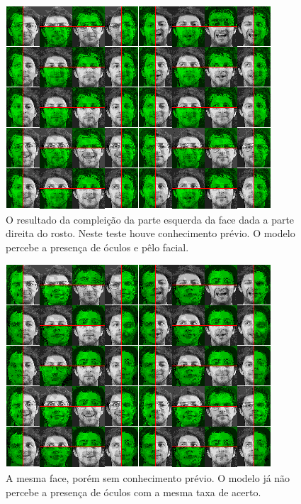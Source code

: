 \documentclass[12pt]{article}
\theoremstyle{plain}
\numberwithin{equation}{section}
\begin{document}
\begin{figure}[h]
  \centering\includegraphics[scale=0.9]{imgs/c1_face_cmpl_39.png}
  \captionsetup{justification=raggedright}
  \caption{O resultado da compleição da parte esquerda da face dada a parte direita do rosto. Neste
  teste houve conhecimento prévio. O modelo percebe a presença de óculos e pêlo facial.}
\end{figure}
\newpage

\begin{figure}[H]
  \centering\includegraphics[scale=0.9]{imgs/c2_face_cmpl_39.png}
  \captionsetup{justification=raggedright}
  \caption{A mesma face, porém sem conhecimento prévio. O modelo já não percebe a presença de
  óculos com a mesma taxa de acerto.}
\end{figure}

\printbibliography[]
\end{document}
